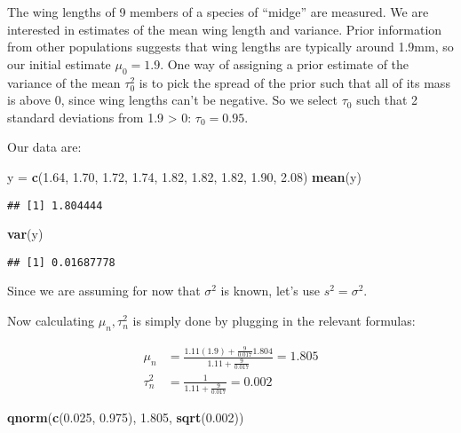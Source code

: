\documentclass[]{article}
\newenvironment{Shaded}{\begin{snugshade}}{\end{snugshade}}
\newcommand{\FloatTok}[1]{\textcolor[rgb]{0.00,0.00,0.81}{#1}}
\newcommand{\KeywordTok}[1]{\textcolor[rgb]{0.13,0.29,0.53}{\textbf{#1}}}
\newcommand{\NormalTok}[1]{#1}
\newcommand{\StringTok}[1]{\textcolor[rgb]{0.31,0.60,0.02}{#1}}
\begin{document}
The wing lengths of 9 members of a species of ``midge'' are measured. We
are interested in estimates of the mean wing length and variance. Prior
information from other populations suggests that wing lengths are
typically around 1.9mm, so our initial estimate \(\mu_0 = 1.9\). One way
of assigning a prior estimate of the variance of the mean \(\tau_0^2\)
is to pick the spread of the prior such that all of its mass is above 0,
since wing lengths can't be negative. So we select \(\tau_0\) such that
2 standard deviations from 1.9 \textgreater{} 0: \(\tau_0 = 0.95\).

Our data are:

\begin{Shaded}
\begin{Highlighting}[]
\NormalTok{y =}\StringTok{ }\KeywordTok{c}\NormalTok{(}\FloatTok{1.64}\NormalTok{, }\FloatTok{1.70}\NormalTok{, }\FloatTok{1.72}\NormalTok{, }\FloatTok{1.74}\NormalTok{, }\FloatTok{1.82}\NormalTok{, }\FloatTok{1.82}\NormalTok{, }\FloatTok{1.82}\NormalTok{, }\FloatTok{1.90}\NormalTok{, }\FloatTok{2.08}\NormalTok{)}
\KeywordTok{mean}\NormalTok{(y)}
\end{Highlighting}
\end{Shaded}

\begin{verbatim}
## [1] 1.804444
\end{verbatim}

\begin{Shaded}
\begin{Highlighting}[]
\KeywordTok{var}\NormalTok{(y)}
\end{Highlighting}
\end{Shaded}

\begin{verbatim}
## [1] 0.01687778
\end{verbatim}

Since we are assuming for now that \(\sigma^2\) is known, let's use
\(s^2 = \sigma^2\).

Now calculating \(\mu_n, \tau_n^2\) is simply done by plugging in the
relevant formulas:

\begin{align}
\mu_n &= \frac{1.11 (1.9) + \frac{9}{0.017} 1.804}{1.11 + \frac{9}{0.017}} = 1.805 \\
\tau_n^2 &= \frac{1}{1.11 + \frac{9}{0.017}} = 0.002
\end{align}

\begin{Shaded}
\begin{Highlighting}[]
\KeywordTok{qnorm}\NormalTok{(}\KeywordTok{c}\NormalTok{(}\FloatTok{0.025}\NormalTok{, }\FloatTok{0.975}\NormalTok{), }\FloatTok{1.805}\NormalTok{, }\KeywordTok{sqrt}\NormalTok{(}\FloatTok{0.002}\NormalTok{))}
\end{Highlighting}
\end{Shaded}
\end{document}
